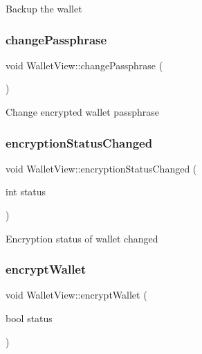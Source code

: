Backup the wallet \mbox{\label{class_wallet_view_a36699c31e256becb2afd92f834830ba0}} 
\subsubsection{\texorpdfstring{changePassphrase}{changePassphrase}}
{\footnotesize\ttfamily void Wallet\+View\+::change\+Passphrase (\begin{DoxyParamCaption}{ }\end{DoxyParamCaption})\hspace{0.3cm}{\ttfamily [slot]}}

Change encrypted wallet passphrase \mbox{\label{class_wallet_view_a98ed22bbde34c1e614e60ecd0b07f03b}} 
\subsubsection{\texorpdfstring{encryptionStatusChanged}{encryptionStatusChanged}}
{\footnotesize\ttfamily void Wallet\+View\+::encryption\+Status\+Changed (\begin{DoxyParamCaption}\item[{int}]{status }\end{DoxyParamCaption})\hspace{0.3cm}{\ttfamily [signal]}}

Encryption status of wallet changed \mbox{\label{class_wallet_view_a164c3de8fc69ef6f39fb7c15e4bda553}} 
\subsubsection{\texorpdfstring{encryptWallet}{encryptWallet}}
{\footnotesize\ttfamily void Wallet\+View\+::encrypt\+Wallet (\begin{DoxyParamCaption}\item[{bool}]{status }\end{DoxyParamCaption})\hspace{0.3cm}{\ttfamily [slot]}}

